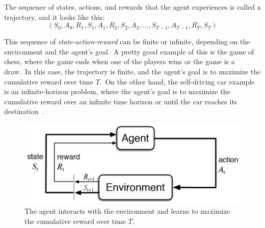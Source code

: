 \documentclass[../xlapes02]{subfiles}
\begin{document}
    The sequence of states, actions, and rewards that the agent experiences is called a trajectory, and it looks like this:
    \begin{equation}
        \label{eq:trajectory}
        (S_0, A_0, R_1, S_1, A_1, R_2, S_2, A_2, \dots, S_{T-1}, A_{T-1}, R_T, S_T)
    \end{equation}

    This sequence of \emph{state-action-reward} can be finite or infinite, depending on the environment and the agent's goal.\ A pretty good example of this is the game of chess, where the game ends when one of the players wins or the game is a draw.\ In this case, the trajectory is finite, and the agent's goal is to maximize the cumulative reward over time $T$.\ On the other hand, the self-driving car example is an infinite-horizon problem, where the agent's goal is to maximize the cumulative reward over an infinite time horizon or until the car reaches its destination~\cite{FITMT25127}.

    \begin{figure}[h]
        \label{fig:rl-introduction}
        \includegraphics[width=0.7\linewidth]{image/agent-environment}
        \centering
        \caption{The agent interacts with the environment and learns to maximize the cumulative reward over time $T$.}
    \end{figure}
\end{document}
